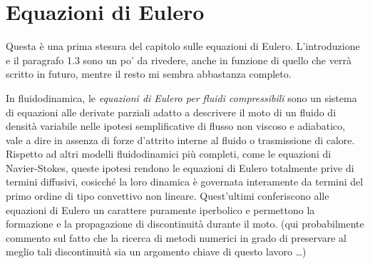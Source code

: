 \chapter{Equazioni di Eulero} \label{ch:euler-equations}

Questa è una prima stesura del capitolo sulle equazioni di Eulero.
L'introduzione e il paragrafo 1.3 sono un po' da rivedere,
anche in funzione di quello che verrà scritto in futuro,
mentre il resto mi sembra abbastanza completo.
\vspace{1em}

%	
%	
%	
%	
%	
%	

In fluidodinamica, le \emph{equazioni di Eulero per fluidi compressibili}
sono un sistema di equazioni alle derivate parziali
adatto a descrivere il moto di un fluido di densità variabile nelle ipotesi
semplificative di flusso non viscoso e adiabatico, vale a dire
in assenza di forze d'attrito interne al fluido o trasmissione di calore.
Rispetto ad altri modelli fluidodinamici più completi,
come le equazioni di Navier-Stokes, queste ipotesi rendono
le equazioni di Eulero totalmente prive di termini diffusivi,
cosicché la loro dinamica è governata interamente da termini del primo ordine
di tipo convettivo non lineare. Quest'ultimi
conferiscono alle equazioni di Eulero un carattere puramente iperbolico
e permettono la formazione e la propagazione di discontinuità durante il moto.
(qui probabilmente commento sul fatto che la ricerca di metodi numerici in grado di
preservare al meglio tali discontinuità sia un argomento chiave
di questo lavoro \dots)

